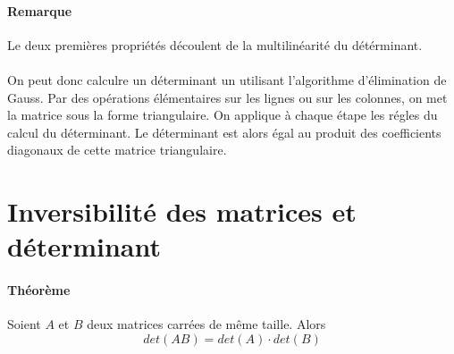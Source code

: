 \paragraph{Remarque} Le deux premières propriétés découlent de la multilinéarité du détérminant.

\paragraph{} On peut donc calculre un déterminant un utilisant l'algorithme d'élimination de Gauss. Par des opérations élémentaires sur les lignes ou sur les colonnes, on met la matrice sous la forme triangulaire. On applique à chaque étape les régles du calcul du déterminant. Le déterminant est alors égal au produit des coefficients diagonaux de cette matrice triangulaire.

%
%
\section{Inversibilité des matrices et déterminant}
%
%
\paragraph{Théorème} Soient $A$ et $B$ deux matrices carrées de même taille. Alors 
$$det(A B) = det(A) \cdot det(B)$$

